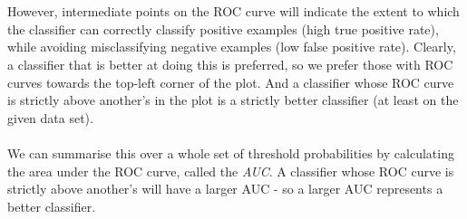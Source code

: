 \documentclass[11pt]{article} %
\theoremstyle{plain}
\theoremstyle{definition}
\begin{document}
\\
\\
\noindent
However, intermediate points on the ROC curve will indicate the extent to which the classifier can correctly classify positive examples (high true positive rate), while avoiding misclassifying negative examples (low false positive rate). Clearly, a classifier that is better at doing this is preferred, so we prefer those with ROC curves towards the top-left corner of the plot. And a classifier whose ROC curve is strictly above another's in the plot is a strictly better classifier (at least on the given data set).
\\
\\
\noindent
We can summarise this over a whole set of threshold probabilities by calculating the area under the ROC curve, called the \textit{AUC}. A classifier whose ROC curve is strictly above another's will have a larger AUC - so a larger AUC represents a better classifier.

\newpage
\end{document}
